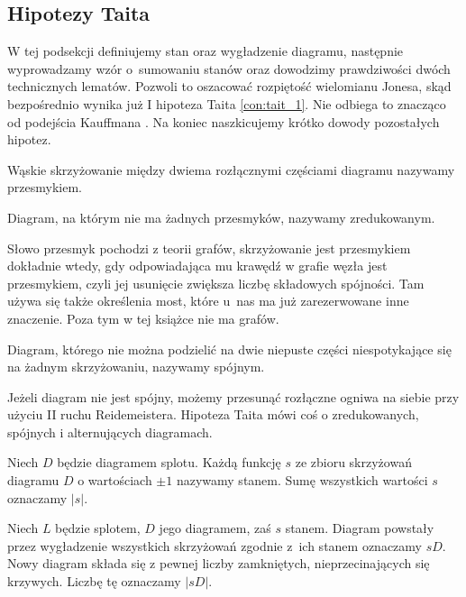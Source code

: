 
\subsection{Hipotezy Taita}
\label{sub:tait_conjectures}%
%
W tej podsekcji definiujemy stan oraz wygładzenie diagramu, następnie wyprowadzamy wzór o~sumowaniu stanów oraz dowodzimy prawdziwości dwóch technicznych lematów.
Pozwoli to oszacować rozpiętość wielomianu Jonesa, skąd bezpośrednio wynika już I hipoteza Taita \ref{con:tait_1}.
Nie odbiega to znacząco od podejścia Kauffmana \cite{kauffman1987}.
%
Na koniec naszkicujemy krótko dowody pozostałych hipotez.

\begin{definition}
%
%
    Wąskie skrzyżowanie między dwiema rozłącznymi częściami diagramu nazywamy przesmykiem.

    Diagram, na którym nie ma żadnych przesmyków, nazywamy zredukowanym.
\end{definition}

Słowo przesmyk pochodzi z teorii grafów, skrzyżowanie jest przesmykiem dokładnie wtedy, gdy odpowiadająca mu krawędź w grafie węzła jest przesmykiem, czyli jej usunięcie zwiększa liczbę składowych spójności.
Tam używa się także określenia most, które u~nas ma już zarezerwowane inne znaczenie.
Poza tym w tej książce nie ma grafów.

\begin{definition}
%
    Diagram, którego nie można podzielić na dwie niepuste części niespotykające się na żadnym skrzyżowaniu, nazywamy spójnym.
\end{definition}

Jeżeli diagram nie jest spójny, możemy przesunąć rozłączne ogniwa na siebie przy użyciu II ruchu Reidemeistera.
Hipoteza Taita mówi coś o zredukowanych, spójnych i alternujących diagramach.

\begin{definition}[stan]
%
    Niech $D$ będzie diagramem splotu.
    Każdą funkcję $s$ ze zbioru skrzyżowań diagramu $D$ o wartościach $\pm 1$ nazywamy stanem.
    Sumę wszystkich wartości $s$ oznaczamy $|s|$.
\end{definition}

\begin{definition}
%
    Niech $L$ będzie splotem, $D$ jego diagramem, zaś $s$ stanem.
    Diagram powstały przez wygładzenie wszystkich skrzyżowań zgodnie z~ich stanem oznaczamy $sD$.
    Nowy diagram składa się z pewnej liczby zamkniętych, nieprzecinających się krzywych.
    Liczbę tę oznaczamy $|sD|$.
\end{definition}

